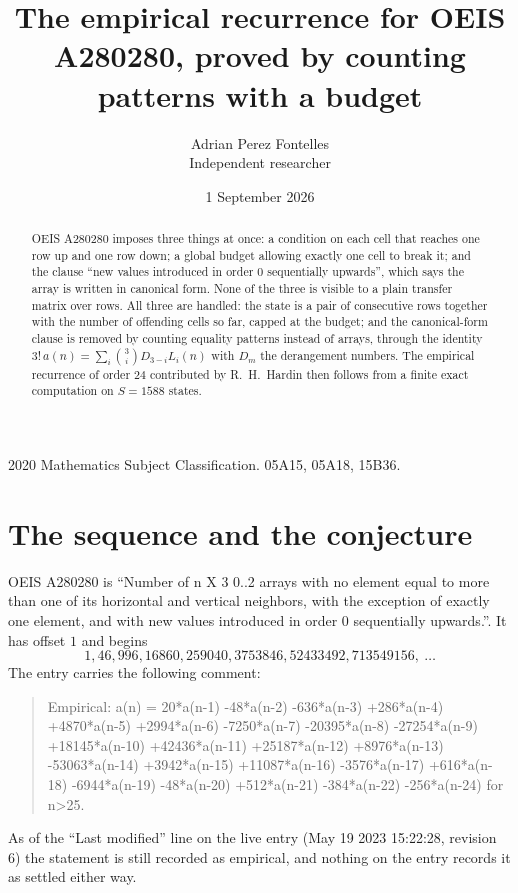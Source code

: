 \documentclass[11pt,a4paper]{article}
\title{The empirical recurrence for OEIS A280280, proved by counting patterns with a budget}
\author{Adrian Perez Fontelles\\ \small Independent researcher}
\date{1 September 2026}
\theoremstyle{plain}
\theoremstyle{definition}
\begin{document}
\maketitle

\begin{abstract}
OEIS A280280 imposes three things at once: a condition on each cell that reaches one row up and
one row down; a global budget allowing exactly one cell to
break it; and the clause ``new values introduced in order $0$ sequentially upwards'', which
says the array is written in canonical form. None of the three is visible to a plain transfer
matrix over rows. All three are handled: the state is a pair of consecutive rows
together with the number of offending cells so far, capped at the budget; and the
canonical-form clause is removed by counting equality patterns instead of arrays, through the
identity $3!\,a(n)=\sum_i\binom{3}{i}D_{3-i}L_i(n)$ with $D_m$ the derangement
numbers. The empirical recurrence of order $24$ contributed by R.~H.~Hardin then follows
from a finite exact computation on $S=1588$ states.
\end{abstract}

\noindent\small 2020 Mathematics Subject Classification. 05A15, 05A18, 15B36.\normalsize

\section{The sequence and the conjecture}

OEIS A280280 is ``Number of n X 3 0..2 arrays with no element equal to more than one of its horizontal and vertical neighbors, with the exception of exactly one element, and with new values introduced in order 0 sequentially upwards.''. It has offset $1$ and begins
\[
1, 46, 996, 16860, 259040, 3753846, 52433492, 713549156,\ \dots
\]
The entry carries the following comment:
\begin{quote}\small
Empirical: a(n) = 20*a(n-1) -48*a(n-2) -636*a(n-3) +286*a(n-4) +4870*a(n-5) +2994*a(n-6) -7250*a(n-7) -20395*a(n-8) -27254*a(n-9) +18145*a(n-10) +42436*a(n-11) +25187*a(n-12) +8976*a(n-13) -53063*a(n-14) +3942*a(n-15) +11087*a(n-16) -3576*a(n-17) +616*a(n-18) -6944*a(n-19) -48*a(n-20) +512*a(n-21) -384*a(n-22) -256*a(n-24) for n>25.
\end{quote}
As of the ``Last modified'' line on the live entry (May 19 2023 15:22:28, revision 6) the statement is
still recorded as empirical, and nothing on the entry records it as settled either way.
\end{document}
